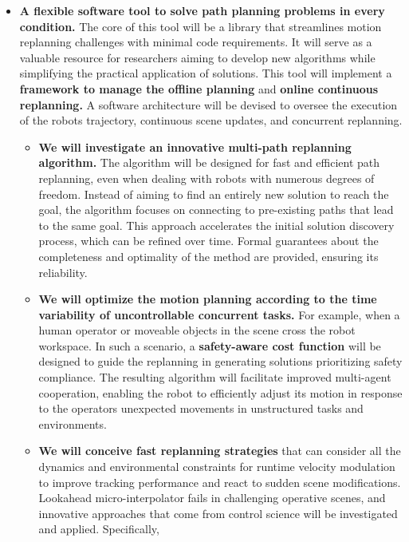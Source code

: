 \begin{itemize}
\item
  \textbf{A flexible software tool to solve path planning problems in
  every condition.} The core of this tool will be a library that
  streamlines motion replanning challenges with minimal code
  requirements. It will serve as a valuable resource for researchers
  aiming to develop new algorithms while simplifying the practical
  application of solutions. This tool will implement a \textbf{framework
  to manage the offline planning} and \textbf{online continuous
  replanning.} A software architecture will be devised to oversee the
  execution of the robot\textquotesingle s trajectory, continuous scene
  updates, and concurrent replanning.

  \begin{itemize}
  \item
    \textbf{We will investigate an innovative multi-path replanning
    algorithm.} The algorithm will be designed for fast and efficient
    path replanning, even when dealing with robots with numerous degrees
    of freedom. Instead of aiming to find an entirely new solution to
    reach the goal, the algorithm focuses on connecting to pre-existing
    paths that lead to the same goal. This approach accelerates the
    initial solution discovery process, which can be refined over time.
    Formal guarantees about the completeness and optimality of the
    method are provided, ensuring its reliability.
  \item
    \textbf{We will optimize the motion planning according to the time
    variability of uncontrollable concurrent tasks.} For example, when a
    human operator or moveable objects in the scene cross the robot
    workspace. In such a scenario, a \textbf{safety-aware cost function}
    will be designed to guide the replanning in generating solutions
    prioritizing safety compliance. The resulting algorithm will
    facilitate improved multi-agent cooperation, enabling the robot to
    efficiently adjust its motion in response to the
    operator\textquotesingle s unexpected movements in unstructured
    tasks and environments.
  \item
    \textbf{We will conceive fast replanning strategies} that can
    consider all the dynamics and environmental constraints for runtime
    velocity modulation to improve tracking performance and react to
    sudden scene modifications. Lookahead micro-interpolator fails in
    challenging operative scenes, and innovative approaches that come
    from control science will be investigated and applied. Specifically,

\end{itemize}
\end{itemize}
